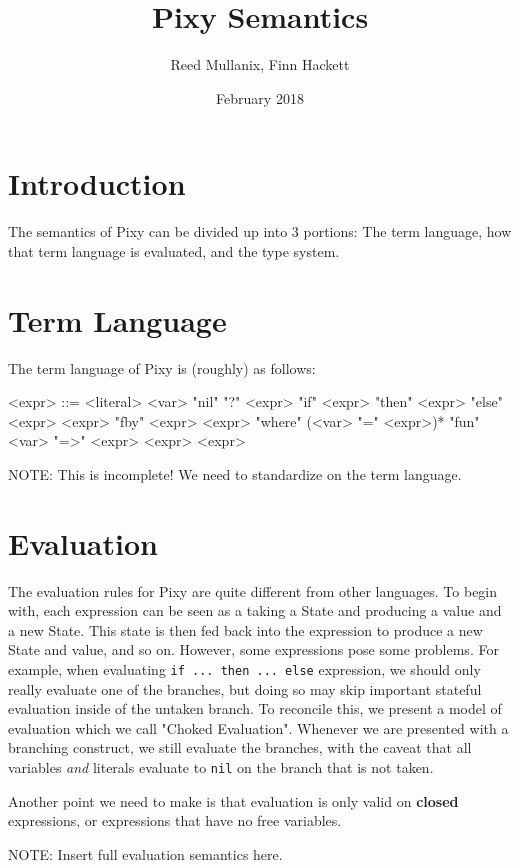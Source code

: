 \documentclass{article}
\title{Pixy Semantics}
\author{Reed Mullanix, Finn Hackett}
\date{February 2018}
\begin{document}
\maketitle

\section{Introduction}
The semantics of Pixy can be divided up into 3 portions: The term language, how that term language is evaluated, and the type system.
\section{Term Language}
The term language of Pixy is (roughly) as follows:
\begin{grammar}
<expr>  ::= <literal>
    \alt <var>
    \alt "nil"
    \alt "?" <expr>
    \alt "if" <expr> "then" <expr> "else" <expr>
    \alt <expr> "fby" <expr>
    \alt <expr> "where" (<var> "=" <expr>)*
    \alt "fun" <var> "=>" <expr>
    \alt <expr> <expr>
\end{grammar}

{\color{red} NOTE:} This is incomplete! We need to standardize on the term language.

\section{Evaluation}
The evaluation rules for Pixy are quite different from other languages.
To begin with, each expression can be seen as a taking a State and producing a value and a new State. This state is then fed back into the expression to produce a new State and value, and so on. However, some expressions pose some problems. For example, when evaluating \lstinline{if ... then ... else} expression, we should only really evaluate one of the branches, but doing so may skip important stateful evaluation inside of the untaken branch. To reconcile this, we present a model of evaluation which we call "Choked Evaluation". Whenever we are presented with a branching construct, we still evaluate the branches, with the caveat that all variables \textit{and} literals evaluate to \lstinline{nil} on the branch that is not taken.

Another point we need to make is that evaluation is only valid on \textbf{closed} expressions, or expressions that have no free variables.

{\color{red} NOTE:} Insert full evaluation semantics here.
\end{document}
